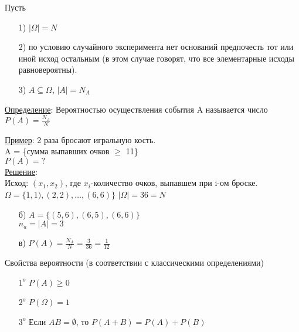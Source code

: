 
Пусть 
\begin{enumerate}
	\item[1)]
	$|\Omega| = N$
	
	\item[2)]
	по условию случайного эксперимента нет оснований предпочесть тот или иной исход остальным (в этом случае говорят, что все элементарные исходы равновероятны).
	
	\item[3)]
	$A \subseteq \Omega$, $|A| = N_A$
\end{enumerate}

\underline{Определение}: Вероятностью осуществления события A называется число 
$P(A) = \frac{N_A}{N}$

\underline{Пример}: 2 раза бросают игральную кость. \\
A = \{сумма выпавших очков $\geqslant$ 11\} \\
$P(A) = ?$ \\

\underline{Решение}: \\
Исход: $(x_1, x_2)$, где $x_i$-количество очков, выпавшем при i-ом броске. \\
$\Omega = \{1,1), (2,2), \ldots , (6,6)\}$ 
$|\Omega| = 36 = N$

\begin{enumerate}
	\item[б)]
	$A = \{(5,6), (6,5), (6,6)\}$ \\
	$n_a = |A| = 3$ \\
	
	\item[в)]
	$P(A) = \frac{N_A}{N} = \frac{3}{36} = \frac{1}{12}$
\end{enumerate}

Свойства вероятности (в соответствии с классическими определениями)
\begin{enumerate}
	\item[$1^o$]
	$P(A) \geqslant 0$
	
	\item[$2^o$]
	$P(\Omega) = 1$
	
	\item[$3^o$]
	Если $AB = \emptyset$, то $P(A+B) = P(A) + P(B)$
\end{enumerate}

